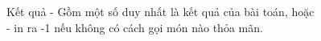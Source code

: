 Kết quả
- Gồm một số duy nhất là kết quả của bài toán, hoặc   
\\   - in ra -1 nếu không có cách gọi món nào thỏa mãn.